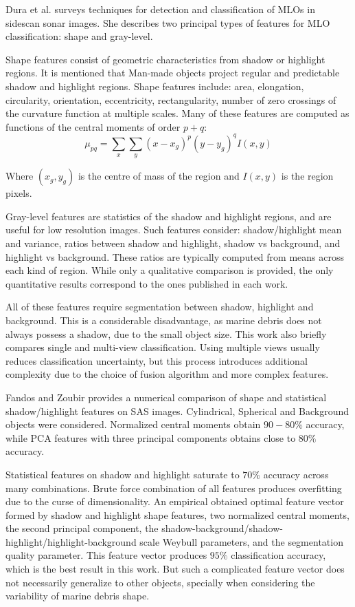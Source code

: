 Dura et al. \cite{dura2011image} surveys techniques for detection and classification of MLOs in sidescan sonar images. She describes two principal types of features for MLO classification: shape and gray-level.

Shape features consist of geometric characteristics from shadow or highlight regions. It is mentioned that Man-made objects project regular and predictable shadow and highlight regions. Shape features include: area, elongation, circularity, orientation, eccentricity, rectangularity, number of zero crossings of the curvature function at multiple scales. Many of these features are computed as functions of the central moments of order $p + q$:
\vspace*{1em}
\begin{equation}
	\mu_{pq} = \sum_x \sum_y (x - x_g)^p (y - y_g)^q I(x, y)
\end{equation}

Where $(x_g, y_g)$ is the centre of mass of the region and $I(x, y)$ is the region pixels. 

Gray-level features are statistics of the shadow and highlight regions, and are useful for low resolution images. Such features consider: shadow/highlight mean and variance, ratios between shadow and highlight, shadow vs background, and highlight vs background. These ratios are typically computed from means across each kind of region. While only a qualitative comparison is provided, the only quantitative results correspond to the ones published in each work.

All of these features require segmentation between shadow, highlight and background. This is a considerable disadvantage, as marine debris does not always possess a shadow, due to the small object size.
This work also briefly compares single and multi-view classification. Using multiple views usually reduces classification uncertainty, but this process introduces additional complexity due to the choice of fusion algorithm and more complex features.

Fandos and Zoubir \cite[-2em]{fandos2011optimal} provides a numerical comparison of shape and statistical shadow/highlight features on SAS images. Cylindrical, Spherical and Background objects were considered. Normalized central moments obtain $90-80 \%$ accuracy, while PCA features with three principal components obtains close to $80 \%$ accuracy.

Statistical features on shadow and highlight saturate to $70 \%$ accuracy across many combinations. Brute force combination of all features produces overfitting due to the curse of dimensionality. An empirical obtained optimal feature vector formed by shadow and highlight shape features, two normalized central moments, the second principal component, the shadow-background/shadow-highlight/highlight-background scale Weybull parameters, and the segmentation quality parameter.
This feature vector produces $95 \%$ classification accuracy, which is the best result in this work. But such a complicated feature vector does not necessarily generalize to other objects, specially when considering the variability of marine debris shape.

